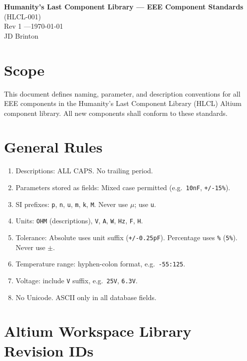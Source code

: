 \documentclass[11pt,a4paper]{article}
\begin{document}
\begin{center}
{\LARGE\bfseries Humanity's Last Component Library --- EEE Component Standards}\\[6pt]
{\large (HLCL-001)}\\[4pt]
{\normalsize Rev 1 \quad---\quad \today}\\[4pt]
{\normalsize JD Brinton}
\end{center}

\vspace{12pt}

\tableofcontents

\section{Scope}

This document defines naming, parameter, and description conventions for all EEE components in the Humanity's Last Component Library (HLCL) Altium component library. All new components shall conform to these standards.

\section{General Rules}

\begin{enumerate}[nosep]
  \item Descriptions: ALL CAPS. No trailing period.
  \item Parameters stored as fields: Mixed case permitted (e.g.\ \texttt{10nF}, \texttt{+/-15\%}).
  \item SI prefixes: \texttt{p}, \texttt{n}, \texttt{u}, \texttt{m}, \texttt{k}, \texttt{M}. Never use $\mu$; use \texttt{u}.
  \item Units: \texttt{OHM} (descriptions), \texttt{V}, \texttt{A}, \texttt{W}, \texttt{Hz}, \texttt{F}, \texttt{H}.
  \item Tolerance: Absolute uses unit suffix (\texttt{+/-0.25pF}). Percentage uses \texttt{\%} (\texttt{5\%}). Never use $\pm$.
  \item Temperature range: hyphen-colon format, e.g.\ \texttt{-55:125}.
  \item Voltage: include \texttt{V} suffix, e.g.\ \texttt{25V}, \texttt{6.3V}.
  \item No Unicode. ASCII only in all database fields.
\end{enumerate}

\section{Altium Workspace Library Revision IDs}
\end{document}
